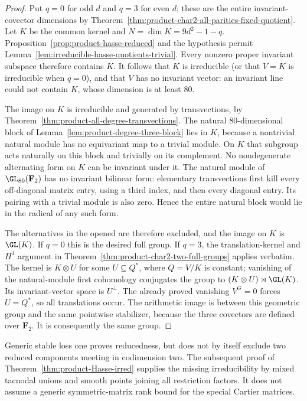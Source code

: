 \begin{proof}
Put $q=0$ for odd $d$ and $q=3$ for even $d$; these are the
entire invariant-covector dimensions by
Theorem~\ref{thm:product-char2-all-parities-fixed-quotient}.
Let $K$ be the common kernel and $N=\dim K=9d^2-1-q$.
Proposition~\ref{prop:product-hasse-reduced} and the hypothesis
permit Lemma~\ref{lem:irreducible-hasse-quotients-trivial}.
Every nonzero proper invariant subspace therefore contains $K$.
It follows that $K$ is irreducible (or that $V=K$ is irreducible
when $q=0$), and that $V$ has no invariant vector: an invariant
line could not contain $K$, whose dimension is at least $80$.

The image on $K$ is irreducible and generated by transvections,
by Theorem~\ref{thm:product-all-degree-transvections}.
The natural $80$-dimensional block of
Lemma~\ref{lem:product-degree-three-block} lies in $K$, because
a nontrivial natural module has no equivariant map to a trivial
module.  On $K$ that subgroup acts naturally on this block and
trivially on its complement.
No nondegenerate alternating form on $K$ can be invariant under
it.  The natural module of $\GL_{80}(\mathbf F_2)$ has no
invariant bilinear form: elementary transvections first kill
every off-diagonal matrix entry, using a third index, and then
every diagonal entry.  Its pairing with a trivial module is
also zero.  Hence the entire natural block would lie in the
radical of any such form.

The alternatives in the opened
\cite[Theorem~3.6, p.~22]{KantorSeress2001} are therefore excluded,
and the image on $K$ is $\GL(K)$.
If $q=0$ this is the desired full group.
If $q=3$, the translation-kernel and $H^1$ argument in
Theorem~\ref{thm:product-char2-two-full-groups} applies verbatim.
The kernel is $K\otimes U$ for some $U\subseteq Q^*$, where
$Q=V/K$ is constant; vanishing of the natural-module first
cohomology conjugates the group to
$(K\otimes U)\rtimes\GL(K)$.
Its invariant-vector space is $U^\perp$.
The already proved vanishing $V^G=0$ forces $U=Q^*$, so all
translations occur.  The arithmetic image is between this
geometric group and the same pointwise stabilizer, because the
three covectors are defined over $\mathbf F_2$.
It is consequently the same group.
\end{proof}

\begin{remark}
Generic stable loss one proves reducedness, but does not by
itself exclude two reduced components meeting in codimension
two. The subsequent proof of
Theorem~\ref{thm:product-Hasse-irred} supplies the missing
irreducibility by mixed tacnodal unions and smooth points
joining all restriction factors. It does not assume a generic
symmetric-matrix rank bound for the special Cartier matrices.
\end{remark}
